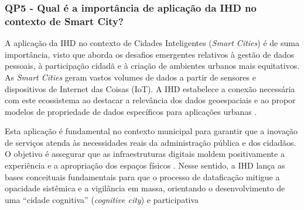 \documentclass[
	12pt,				%
	oneside,			%
	a4paper,			%
	english,			%
	brazil				%
	]{abntex2ppgsi}
\begin{document}


\subsubsection{QP5 - Qual é a importância de aplicação da IHD no contexto de Smart City?}

    A aplicação da IHD no contexto de Cidades Inteligentes (\textit{Smart Cities}) é de suma importância, visto que aborda os desafios emergentes relativos à gestão de dados pessoais, à participação cidadã e à criação de ambientes urbanos mais equitativos. As \textit{Smart Cities} geram vastos volumes de dados a partir de sensores e dispositivos de Internet das Coisas (IoT). A IHD estabelece a conexão necessária com este ecossistema ao destacar a relevância dos dados geoespaciais e ao propor modelos de propriedade de dados específicos para aplicações urbanas \cite{Coleti2024, capeleti2023heuristic, Kurze2023, Crabtree, Capeleti2024Human, Strey2019Human}. 

    Esta aplicação é fundamental no contexto municipal para garantir que a inovação de serviços atenda às necessidades reais da administração pública e dos cidadãos. O objetivo é assegurar que as infraestruturas digitais moldem positivamente a experiência e a apropriação dos espaços físicos \cite{kaufmann2021ethical}. Nesse sentido, a IHD lança as bases conceituais fundamentais para que o processo de dataficação mitigue a opacidade sistêmica e a vigilância em massa, orientando o desenvolvimento de uma ``cidade cognitiva'' (\textit{cognitive city}) e participativa \cite{Coleti2024, DOWTHWAITE2024, Refat2023, Victorelli2020Human, Locoro2020, VICTORELLI2020Understanding, Mashhadi2014, Strey2019Human}
\end{document}
